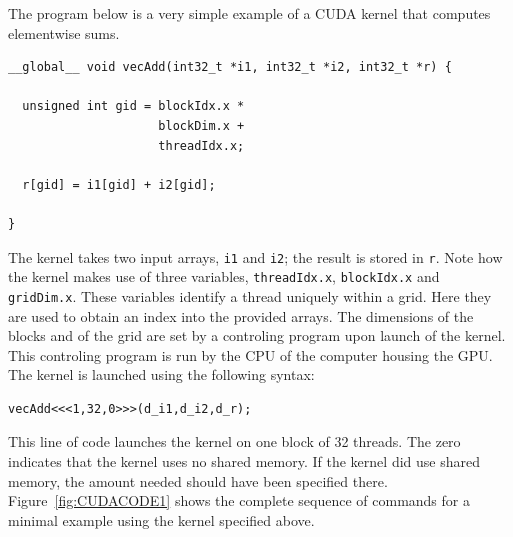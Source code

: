 \documentclass[a4paper]{book}
\begin{document}
The program below is a very simple example of a CUDA kernel that computes elementwise sums. 

\begin{small}
\begin{Verbatim}[samepage=true]
__global__ void vecAdd(int32_t *i1, int32_t *i2, int32_t *r) {
  
  unsigned int gid = blockIdx.x * 
                     blockDim.x + 
                     threadIdx.x;

  r[gid] = i1[gid] + i2[gid]; 

} 

\end{Verbatim}
\end{small}

\noindent The kernel takes two input arrays, {\tt i1} and {\tt i2}; the result is stored 
in {\tt r}. Note how the kernel makes use of three variables, {\tt threadIdx.x}, 
{\tt blockIdx.x} and {\tt gridDim.x}. These variables identify a thread uniquely within 
a grid. Here they are used to obtain an index into the provided arrays. The dimensions of 
the blocks and of the grid are set by a controling program upon launch of the kernel. This 
controling program is run by the CPU of the computer housing the GPU. The kernel is launched 
using the following syntax: 

\begin{small} 
\begin{Verbatim}[samepage=true]
vecAdd<<<1,32,0>>>(d_i1,d_i2,d_r);
\end{Verbatim}
\end{small}

\noindent This line of code launches the kernel on one block of 32 threads. The zero 
indicates that the kernel uses no shared memory. If the kernel did use shared memory, the 
amount needed should have been specified there. Figure~\ref{fig:CUDACODE1} shows the complete 
sequence of commands for a minimal example using the kernel specified above. 

\end{document}
